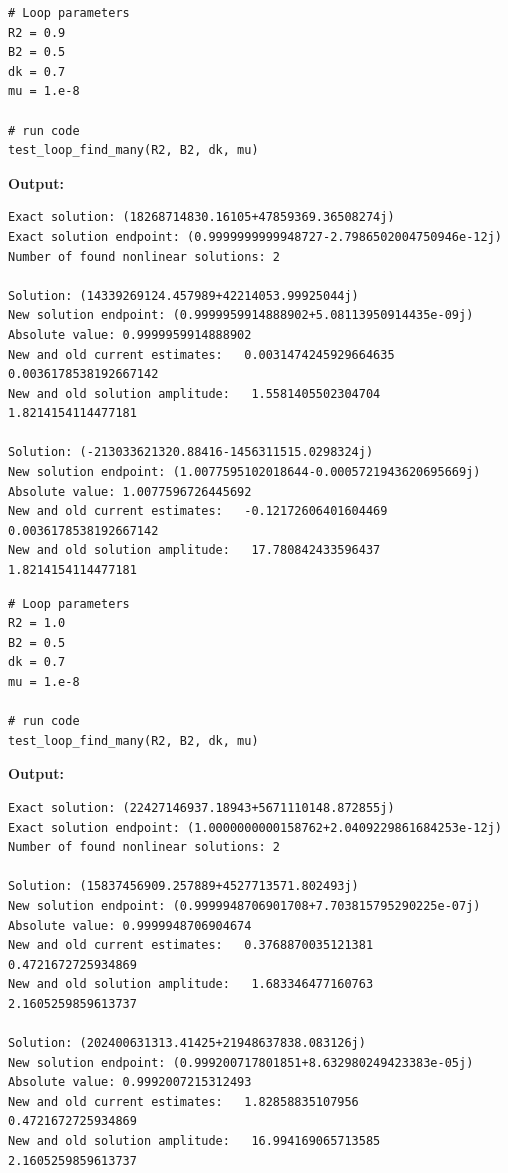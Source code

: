 \documentclass{article}
\begin{document}
\begin{lstlisting}
# Loop parameters
R2 = 0.9
B2 = 0.5
dk = 0.7
mu = 1.e-8

# run code
test_loop_find_many(R2, B2, dk, mu)\end{lstlisting}

\textbf{Output:}\begin{verbatim}
Exact solution: (18268714830.16105+47859369.36508274j)
Exact solution endpoint: (0.9999999999948727-2.7986502004750946e-12j)
Number of found nonlinear solutions: 2

Solution: (14339269124.457989+42214053.99925044j)
New solution endpoint: (0.9999959914888902+5.08113950914435e-09j) Absolute value: 0.9999959914888902
New and old current estimates:   0.0031474245929664635    0.0036178538192667142
New and old solution amplitude:   1.5581405502304704    1.8214154114477181

Solution: (-213033621320.88416-1456311515.0298324j)
New solution endpoint: (1.0077595102018644-0.0005721943620695669j) Absolute value: 1.0077596726445692
New and old current estimates:   -0.12172606401604469    0.0036178538192667142
New and old solution amplitude:   17.780842433596437    1.8214154114477181

\end{verbatim}

\begin{lstlisting}
# Loop parameters
R2 = 1.0
B2 = 0.5
dk = 0.7
mu = 1.e-8

# run code
test_loop_find_many(R2, B2, dk, mu)\end{lstlisting}

\textbf{Output:}\begin{verbatim}
Exact solution: (22427146937.18943+5671110148.872855j)
Exact solution endpoint: (1.0000000000158762+2.0409229861684253e-12j)
Number of found nonlinear solutions: 2

Solution: (15837456909.257889+4527713571.802493j)
New solution endpoint: (0.9999948706901708+7.703815795290225e-07j) Absolute value: 0.9999948706904674
New and old current estimates:   0.3768870035121381    0.4721672725934869
New and old solution amplitude:   1.683346477160763    2.1605259859613737

Solution: (202400631313.41425+21948637838.083126j)
New solution endpoint: (0.999200717801851+8.632980249423383e-05j) Absolute value: 0.9992007215312493
New and old current estimates:   1.82858835107956    0.4721672725934869
New and old solution amplitude:   16.994169065713585    2.1605259859613737

\end{verbatim}
\end{document}
